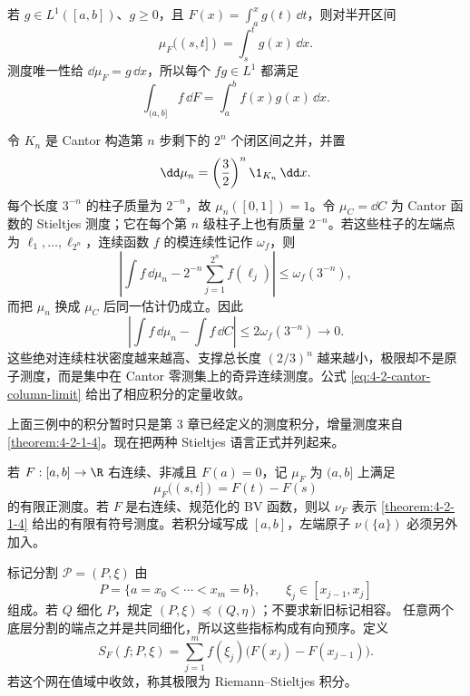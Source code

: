 \begin{example}[光滑密度]\label{ex:4-2-2-2}
若 $g\in L^1([a,b])$、$g\ge0$，且
$F(x)=\int_a^xg(t)\,\dd t$，则对半开区间
\[
 \mu_F((s,t])=\int_s^tg(x)\,\dd x.
\]
测度唯一性给 $\dd\mu_F=g\,\dd x$，所以每个 $fg\in L^1$ 都满足
\[
 \int_{(a,b]}f\,\dd F=\int_a^bf(x)g(x)\,\dd x.
\]
\end{example}

\begin{example}\label{ex:4-2-2-3}
令 $K_n$ 是 Cantor 构造第 $n$ 步剩下的 $2^n$ 个闭区间之并，并置
\[
 \dd\mu_n=\left(\frac32\right)^n\1_{K_n}\,\dd x.
\]
每个长度 $3^{-n}$ 的柱子质量为 $2^{-n}$，故 $\mu_n([0,1])=1$。令 $\mu_C=\dd C$ 为
Cantor 函数的 Stieltjes 测度；它在每个第 $n$ 级柱子上也有质量 $2^{-n}$。若这些柱子的左端点为
$\ell_1,\dots,\ell_{2^n}$，连续函数 $f$ 的模连续性记作 $\omega_f$，则
\[
 \left|\int f\,\dd\mu_n-2^{-n}\sum_{j=1}^{2^n}f(\ell_j)\right|
 \le\omega_f(3^{-n}),
\]
而把 $\mu_n$ 换成 $\mu_C$ 后同一估计仍成立。因此
\begin{equation}\label{eq:4-2-cantor-column-limit}
 \left|\int f\,\dd\mu_n-\int f\,\dd C\right|
 \le2\omega_f(3^{-n})\longrightarrow0.
\end{equation}
这些绝对连续柱状密度越来越高、支撑总长度 $(2/3)^n$ 越来越小，极限却不是原子测度，而是集中在
Cantor 零测集上的奇异连续测度。公式 \eqref{eq:4-2-cantor-column-limit} 给出了相应积分的定量收敛。
\end{example}

上面三例中的积分暂时只是第 3 章已经定义的测度积分，增量测度来自
\cref{theorem:4-2-1-4}。现在把两种 Stieltjes 语言正式并列起来。

\begin{definition}[Stieltjes 测度]\label{def:4-2-2-1}
若 $F:[a,b]\to\R$ 右连续、非减且 $F(a)=0$，记 $\mu_F$ 为 $(a,b]$ 上满足
\[
 \mu_F((s,t])=F(t)-F(s)
\]
的有限正测度。若 $F$ 是右连续、规范化的 BV 函数，则以 $\nu_F$ 表示
\cref{theorem:4-2-1-4} 给出的有限有符号测度。若积分域写成 $[a,b]$，左端原子
$\nu(\{a\})$ 必须另外加入。
\end{definition}

\begin{definition}[标记分割网]\label{def:4-2-2-2}
标记分割 $\mathcal P=(P,\xi)$ 由
\[
 P=\{a=x_0<\cdots <x_m=b\},\qquad
 \xi_j\in[x_{j-1},x_j]
\]
组成。若 $Q$ 细化 $P$，规定 $(P,\xi)\preceq(Q,\eta)$；不要求新旧标记相容。
任意两个底层分割的端点之并是共同细化，所以这些指标构成有向预序。定义
\[
 S_F(f;P,\xi)
 =\sum_{j=1}^mf(\xi_j)\bigl(F(x_j)-F(x_{j-1})\bigr).
\]
若这个网在值域中收敛，称其极限为 Riemann--Stieltjes 积分。
\end{definition}

